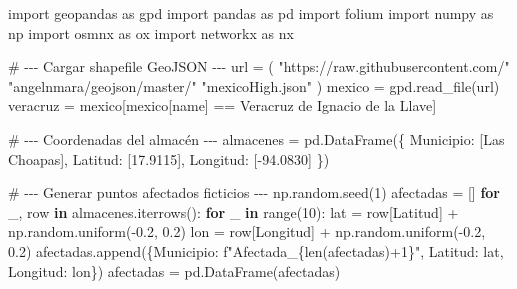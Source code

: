 \documentclass[
  spanish,
  us-letterpaper,
]{scrreprt}
\newenvironment{Shaded}{\begin{snugshade}}{\end{snugshade}}
\newcommand{\BuiltInTok}[1]{\textcolor[rgb]{0.00,0.23,0.31}{#1}}
\newcommand{\CommentTok}[1]{\textcolor[rgb]{0.37,0.37,0.37}{#1}}
\newcommand{\ControlFlowTok}[1]{\textcolor[rgb]{0.00,0.23,0.31}{\textbf{#1}}}
\newcommand{\DecValTok}[1]{\textcolor[rgb]{0.68,0.00,0.00}{#1}}
\newcommand{\FloatTok}[1]{\textcolor[rgb]{0.68,0.00,0.00}{#1}}
\newcommand{\ImportTok}[1]{\textcolor[rgb]{0.00,0.46,0.62}{#1}}
\newcommand{\KeywordTok}[1]{\textcolor[rgb]{0.00,0.23,0.31}{\textbf{#1}}}
\newcommand{\NormalTok}[1]{\textcolor[rgb]{0.00,0.23,0.31}{#1}}
\newcommand{\OperatorTok}[1]{\textcolor[rgb]{0.37,0.37,0.37}{#1}}
\newcommand{\SpecialCharTok}[1]{\textcolor[rgb]{0.37,0.37,0.37}{#1}}
\newcommand{\SpecialStringTok}[1]{\textcolor[rgb]{0.13,0.47,0.30}{#1}}
\newcommand{\StringTok}[1]{\textcolor[rgb]{0.13,0.47,0.30}{#1}}
\numberwithin{equation}{section}
\begin{document}
\begin{Shaded}
\begin{Highlighting}[]
\ImportTok{import}\NormalTok{ geopandas }\ImportTok{as}\NormalTok{ gpd}
\ImportTok{import}\NormalTok{ pandas }\ImportTok{as}\NormalTok{ pd}
\ImportTok{import}\NormalTok{ folium}
\ImportTok{import}\NormalTok{ numpy }\ImportTok{as}\NormalTok{ np}
\ImportTok{import}\NormalTok{ osmnx }\ImportTok{as}\NormalTok{ ox}
\ImportTok{import}\NormalTok{ networkx }\ImportTok{as}\NormalTok{ nx}

\CommentTok{\# {-}{-}{-} Cargar shapefile GeoJSON {-}{-}{-}}
\NormalTok{url }\OperatorTok{=}\NormalTok{ (}
    \StringTok{"https://raw.githubusercontent.com/"}
    \StringTok{"angelnmara/geojson/master/"}
    \StringTok{"mexicoHigh.json"}
\NormalTok{)}
\NormalTok{mexico }\OperatorTok{=}\NormalTok{ gpd.read\_file(url)}
\NormalTok{veracruz }\OperatorTok{=}\NormalTok{ mexico[mexico[}\StringTok{\textquotesingle{}name\textquotesingle{}}\NormalTok{] }\OperatorTok{==} \StringTok{\textquotesingle{}Veracruz de Ignacio de la Llave\textquotesingle{}}\NormalTok{]}

\CommentTok{\# {-}{-}{-} Coordenadas del almacén {-}{-}{-}}
\NormalTok{almacenes }\OperatorTok{=}\NormalTok{ pd.DataFrame(\{}
    \StringTok{\textquotesingle{}Municipio\textquotesingle{}}\NormalTok{: [}\StringTok{\textquotesingle{}Las Choapas\textquotesingle{}}\NormalTok{],}
    \StringTok{\textquotesingle{}Latitud\textquotesingle{}}\NormalTok{: [}\FloatTok{17.9115}\NormalTok{],}
    \StringTok{\textquotesingle{}Longitud\textquotesingle{}}\NormalTok{: [}\OperatorTok{{-}}\FloatTok{94.0830}\NormalTok{]}
\NormalTok{\})}

\CommentTok{\# {-}{-}{-} Generar puntos afectados ficticios {-}{-}{-}}
\NormalTok{np.random.seed(}\DecValTok{1}\NormalTok{)}
\NormalTok{afectadas }\OperatorTok{=}\NormalTok{ []}
\ControlFlowTok{for}\NormalTok{ \_, row }\KeywordTok{in}\NormalTok{ almacenes.iterrows():}
    \ControlFlowTok{for}\NormalTok{ \_ }\KeywordTok{in} \BuiltInTok{range}\NormalTok{(}\DecValTok{10}\NormalTok{):}
\NormalTok{        lat }\OperatorTok{=}\NormalTok{ row[}\StringTok{\textquotesingle{}Latitud\textquotesingle{}}\NormalTok{] }\OperatorTok{+}\NormalTok{ np.random.uniform(}\OperatorTok{{-}}\FloatTok{0.2}\NormalTok{, }\FloatTok{0.2}\NormalTok{)}
\NormalTok{        lon }\OperatorTok{=}\NormalTok{ row[}\StringTok{\textquotesingle{}Longitud\textquotesingle{}}\NormalTok{] }\OperatorTok{+}\NormalTok{ np.random.uniform(}\OperatorTok{{-}}\FloatTok{0.2}\NormalTok{, }\FloatTok{0.2}\NormalTok{)}
\NormalTok{        afectadas.append(\{}\StringTok{\textquotesingle{}Municipio\textquotesingle{}}\NormalTok{: }\SpecialStringTok{f"Afectada\_}\SpecialCharTok{\{}\BuiltInTok{len}\NormalTok{(afectadas)}\OperatorTok{+}\DecValTok{1}\SpecialCharTok{\}}\SpecialStringTok{"}\NormalTok{,}
         \StringTok{\textquotesingle{}Latitud\textquotesingle{}}\NormalTok{: lat, }\StringTok{\textquotesingle{}Longitud\textquotesingle{}}\NormalTok{: lon\})}
\NormalTok{afectadas }\OperatorTok{=}\NormalTok{ pd.DataFrame(afectadas)}


\end{Highlighting}
\end{Shaded}
\end{document}
